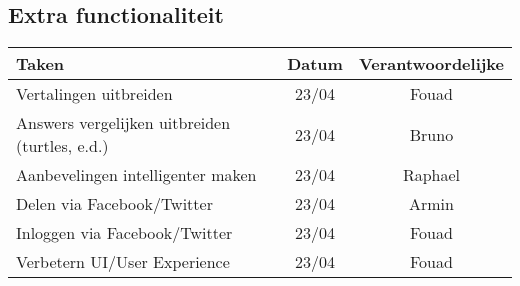 \subsection{Extra functionaliteit}
\begin{tabular}{| l | c | c |}
    \hline
    Taken   &   Datum   &   Verantwoordelijke \\
    \hline \hline
    Vertalingen uitbreiden  &   23/04   &   Fouad   \\
    Answers vergelijken uitbreiden (turtles, e.d.)  &   23/04   &   Bruno   \\
    Aanbevelingen intelligenter maken   &   23/04   &   Raphael \\
    Delen via Facebook/Twitter  &   23/04   &   Armin   \\
    Inloggen via Facebook/Twitter   &   23/04   &   Fouad  \\
    Verbetern UI/User Experience    &   23/04   &   Fouad \\
    \hline
\end{tabular}
